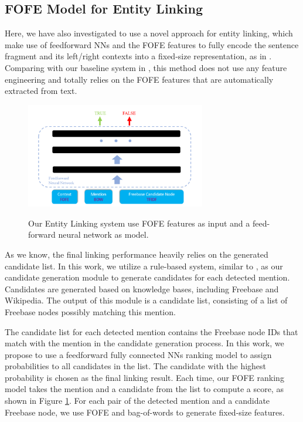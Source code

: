 \documentclass[11pt]{article}
\begin{document}
\subsection{FOFE Model for Entity Linking}

Here, we have also investigated to use a novel approach for entity linking, which make use of feedforward NNs and the FOFE features \cite{zhang2015fixed} to fully encode the sentence fragment and its left/right contexts into a fixed-size
representation, as in \cite{xu2017local}. Comparing with our baseline system in \cite{kbp2016iflytek}, this method does not use any feature engineering and totally relies on the FOFE features that are automatically extracted from text. 

\begin{figure}[h]
  \centering
  \includegraphics[width=0.7\textwidth]{FOFE-Entity-Linking.png}\\
  \caption{Our Entity Linking system use FOFE features as input and a feed-forward neural network as model.}\label{FOFE-DL-fg:2}
\end{figure}

As we know, the final linking performance heavily relies on the generated candidate list. In this
work, we utilize a rule-based system, similar to \cite{kbp2016iflytek}, as our candidate generation module to generate
candidates for each detected mention. Candidates
are generated based on knowledge bases,
including Freebase and Wikipedia. The output of
this module is a candidate list, consisting of a list
of Freebase nodes possibly matching this mention.

The candidate list for each detected mention contains
the Freebase node IDs that match with the
mention in the candidate generation process. In
this work, we propose to use a feedforward fully connected
NNs ranking model to assign probabilities
to all candidates in the list. The candidate
with the highest probability is chosen as the final
linking result. Each time, our FOFE ranking model
takes the mention and a candidate from the list
to compute a score, as shown in Figure \ref{FOFE-DL-fg:2}. For each pair of the detected mention and a candidate Freebase node, we use FOFE and bag-of-words to generate fixed-size features.
\end{document}

